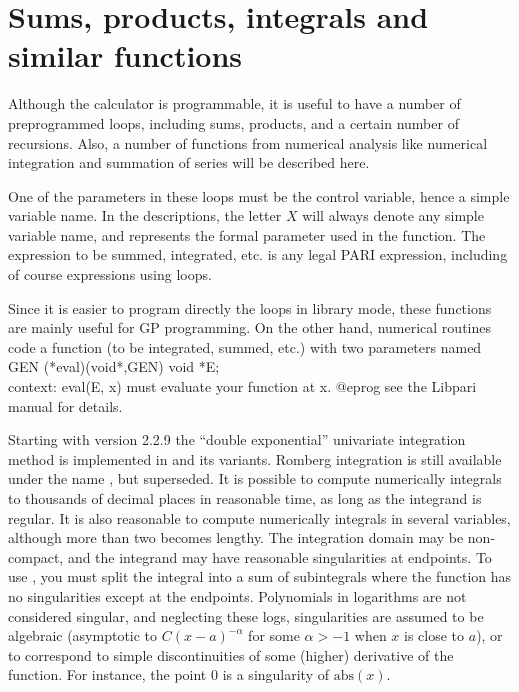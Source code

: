 \section{Sums, products, integrals and similar functions}
\label{se:sums}

Although the  calculator is programmable, it is useful to have
a number of preprogrammed loops, including sums, products, and a certain
number of recursions. Also, a number of functions from numerical analysis
like numerical integration and summation of series will be described here.

One of the parameters in these loops must be the control variable, hence a
simple variable name. In the descriptions, the letter $X$ will always denote
any simple variable name, and represents the formal parameter used in the
function. The expression to be summed, integrated, etc. is any legal PARI
expression, including of course expressions using loops.

Since it is easier to program directly the loops in library mode, these
functions are mainly useful for GP programming. On the other hand, numerical
routines code a function (to be integrated, summed, etc.) with two parameters
named
\bprog
  GEN (*eval)(void*,GEN)
  void *E;  \\ context: eval(E, x) must evaluate your function at x.
@eprog\noindent
see the Libpari manual for details.

Starting with version 2.2.9 the ``double exponential'' univariate
integration method is implemented in  and its variants. Romberg
integration is still available under the name , but
superseded. It is possible to compute numerically integrals to thousands of
decimal places in reasonable time, as long as the integrand is regular. It is
also reasonable to compute numerically integrals in several variables,
although more than two becomes lengthy. The integration domain may be
non-compact, and the integrand may have reasonable singularities at
endpoints. To use , you must split the integral into a sum
of subintegrals where the function has no singularities except at the
endpoints. Polynomials in logarithms are not considered singular, and
neglecting these logs, singularities are assumed to be algebraic (asymptotic
to $C(x-a)^{-\alpha}$ for some $\alpha > -1$ when $x$ is
close to $a$), or to correspond to simple discontinuities of some (higher)
derivative of the function. For instance, the point $0$ is a singularity of
$\text{abs}(x)$.

